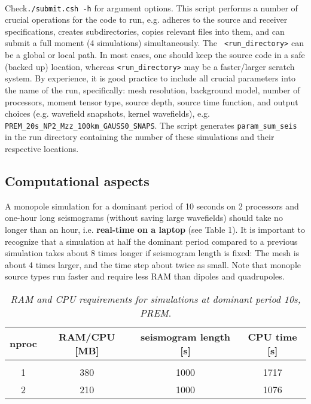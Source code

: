 \documentclass[11pt,letter,fleqn,english,notitlepage]{article}
\begin{document}
\\ 
Check{\tt ./submit.csh -h} for argument options.  This script performs a number
of crucial operations for the code to run, e.g. adheres to the source and
receiver specifications, creates subdirectories, copies relevant files into
them, and can submit a full moment (4 simulations) simultaneously.  The {\tt
<run\_directory>} can be a global or local path. In most cases, one should keep
the source code in a safe (backed up) location, whereas {\tt <run\_directory>}
may be a faster/larger scratch system.  By experience, it is good practice to
include all crucial parameters into the name of the run, specifically: mesh
resolution, background model, number of processors, moment tensor type, source
depth, source time function, and output choices (e.g. wavefield snapshots,
kernel wavefields), e.g.  {\tt PREM\_20s\_NP2\_Mzz\_100km\_GAUSS0\_SNAPS}.  The
script generates {\tt param\_sum\_seis} in the run directory containing the
number of these simulations and their respective locations. 

\subsection{Computational aspects}
\noindent A monopole simulation for a dominant period of 10 seconds on 2
processors and one-hour long seismograms (without saving large wavefields)
should take no longer than an hour, i.e. \textbf{real-time on a laptop} (see
Table 1).  It is important to recognize that a simulation at half the dominant
period compared to a previous simulation takes about 8 times longer if
seismogram length is fixed: The mesh is about 4 times larger, and the time step
about twice as small.  Note that monople source types run faster and require
less RAM than dipoles and quadrupoles.\\

\begin{table*}[htb] 
    \begin{minipage}{150mm}
        \caption{ \textit{RAM and CPU requirements for simulations at dominant period 10s, PREM}.}
        \label{apptable:matrix_op}
        \vspace*{.2cm}
        \begin{tabular}{@{}cccc}
            nproc & RAM/CPU [MB] & seismogram length [s]& CPU time [s]\\
            \hline\\
            1 & 380 & 1000 & 1717\\
            2 & 210 & 1000 & 1076
        \end{tabular}
    \end{minipage}
\end{table*}
\end{document}
